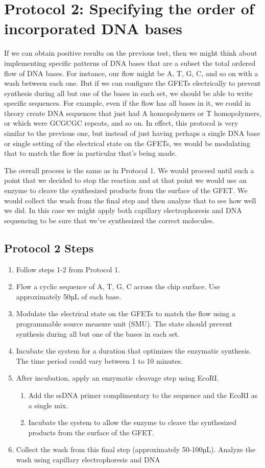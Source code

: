 \documentclass[11pt]{article}
\begin{document}
\section*{Protocol 2: Specifying the order of incorporated DNA bases}

If we can obtain positive results on the previous test, then we might think about implementing specific patterns of DNA bases that are a subset the total ordered flow of DNA bases.
For instance, our flow might be A, T, G, C, and so on with a wash between each one.
But if we can configure the GFETs electrically to prevent synthesis during all but one of the bases in each set, we should be able to write specific sequences.
For example, even if the flow has all bases in it, we could in theory create DNA sequences that just had A homopolymers or T homopolymers, or which were GCGCGC repeats, and so on.
In effect, this protocol is very similar to the previous one, but instead of just having perhaps a single DNA base or single setting of the electrical state on the GFETs, we would be modulating that to match the flow in particular that's being made.

The overall process is the same as in Protocol 1.
We would proceed until such a point that we decided to stop the reaction and at that point we would use an enzyme to cleave the synthesized products from the surface of the GFET.
We would collect the wash from the final step and then analyze that to see how well we did.
In this case we might apply both capillary electrophoresis and DNA sequencing to be sure that we've synthesized the correct molecules.

\subsection*{Protocol 2 Steps}
\begin{enumerate}
    \item Follow steps 1-2 from Protocol 1.
    \item Flow a cyclic sequence of A, T, G, C across the chip surface. Use approximately 50µL of each base.
    \item Modulate the electrical state on the GFETs to match the flow using a programmable source measure unit (SMU). The state should prevent synthesis during all but one of the bases in each set.
    \item Incubate the system for a duration that optimizes the enzymatic synthesis. The time period could vary between 1 to 10 minutes.
    \item After incubation, apply an enzymatic cleavage step using EcoRI.
    \begin{enumerate} %
        \item Add the ssDNA primer complimentary to the sequence and the EcoRI as a single mix.
        \item Incubate the system to allow the enzyme to cleave the synthesized products from the surface of the GFET.
    \end{enumerate}
    \item Collect the wash from this final step (approximately 50-100µL). Analyze the wash using capillary electrophoresis and DNA
\end{enumerate}
\end{document}
